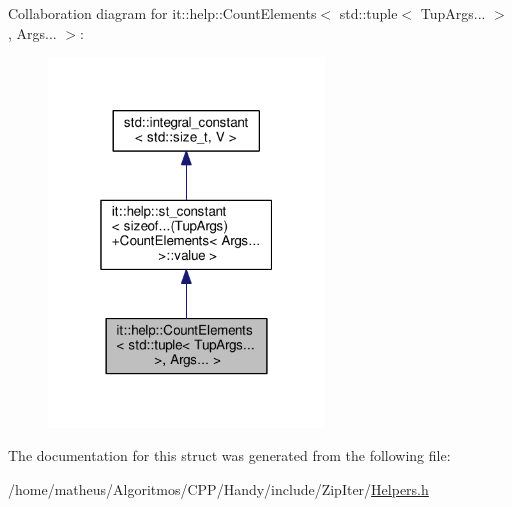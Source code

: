 Collaboration diagram for it\+:\+:help\+:\+:Count\+Elements$<$ std\+:\+:tuple$<$ Tup\+Args... $>$, Args... $>$\+:\nopagebreak
\begin{figure}[H]
\begin{center}
\leavevmode
\includegraphics[width=208pt]{structit_1_1help_1_1CountElements_3_01std_1_1tuple_3_01TupArgs_8_8_8_01_4_00_01Args_8_8_8_01_4__coll__graph}
\end{center}
\end{figure}


The documentation for this struct was generated from the following file\+:\begin{DoxyCompactItemize}
\item 
/home/matheus/\+Algoritmos/\+C\+P\+P/\+Handy/include/\+Zip\+Iter/\hyperlink{ZipIter_2Helpers_8h}{Helpers.\+h}\end{DoxyCompactItemize}
